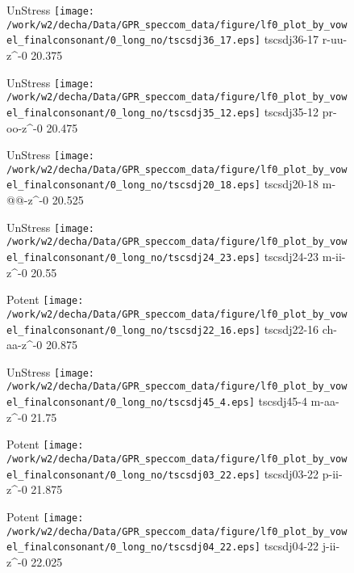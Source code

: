 \documentclass{article}
\begin{document}
\begin{figure}[t]
\begin{minipage}[b]{.24\textwidth}
UnStress
\centering
\texttt{[image: /work/w2/decha/Data/GPR\_speccom\_data/figure/lf0\_plot\_by\_vowel\_finalconsonant/0\_long\_no/tscsdj36\_17.eps]}
tscsdj36-17 r-uu-z\textasciicircum-0 20.375
\end{minipage}
\begin{minipage}[b]{.24\textwidth}
UnStress
\centering
\texttt{[image: /work/w2/decha/Data/GPR\_speccom\_data/figure/lf0\_plot\_by\_vowel\_finalconsonant/0\_long\_no/tscsdj35\_12.eps]}
tscsdj35-12 pr-oo-z\textasciicircum-0 20.475
\end{minipage}
\begin{minipage}[b]{.24\textwidth}
UnStress
\centering
\texttt{[image: /work/w2/decha/Data/GPR\_speccom\_data/figure/lf0\_plot\_by\_vowel\_finalconsonant/0\_long\_no/tscsdj20\_18.eps]}
tscsdj20-18 m-@@-z\textasciicircum-0 20.525
\end{minipage}
\begin{minipage}[b]{.24\textwidth}
UnStress
\centering
\texttt{[image: /work/w2/decha/Data/GPR\_speccom\_data/figure/lf0\_plot\_by\_vowel\_finalconsonant/0\_long\_no/tscsdj24\_23.eps]}
tscsdj24-23 m-ii-z\textasciicircum-0 20.55
\end{minipage}
\end{figure}
\clearpage
\begin{figure}[t]
\begin{minipage}[b]{.24\textwidth}
\colorbox{Apricot}{Potent}
\centering
\texttt{[image: /work/w2/decha/Data/GPR\_speccom\_data/figure/lf0\_plot\_by\_vowel\_finalconsonant/0\_long\_no/tscsdj22\_16.eps]}
tscsdj22-16 ch-aa-z\textasciicircum-0 20.875
\end{minipage}
\begin{minipage}[b]{.24\textwidth}
UnStress
\centering
\texttt{[image: /work/w2/decha/Data/GPR\_speccom\_data/figure/lf0\_plot\_by\_vowel\_finalconsonant/0\_long\_no/tscsdj45\_4.eps]}
tscsdj45-4 m-aa-z\textasciicircum-0 21.75
\end{minipage}
\begin{minipage}[b]{.24\textwidth}
\colorbox{Apricot}{Potent}
\centering
\texttt{[image: /work/w2/decha/Data/GPR\_speccom\_data/figure/lf0\_plot\_by\_vowel\_finalconsonant/0\_long\_no/tscsdj03\_22.eps]}
tscsdj03-22 p-ii-z\textasciicircum-0 21.875
\end{minipage}
\begin{minipage}[b]{.24\textwidth}
\colorbox{Apricot}{Potent}
\centering
\texttt{[image: /work/w2/decha/Data/GPR\_speccom\_data/figure/lf0\_plot\_by\_vowel\_finalconsonant/0\_long\_no/tscsdj04\_22.eps]}
tscsdj04-22 j-ii-z\textasciicircum-0 22.025
\end{minipage}
\end{figure}
\end{document}
